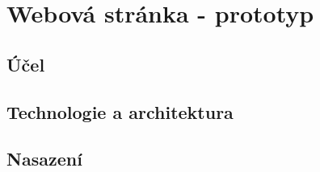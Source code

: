 \chapter{Webová stránka - prototyp}

\section{Účel}

\section{Technologie a architektura}

\section{Nasazení}